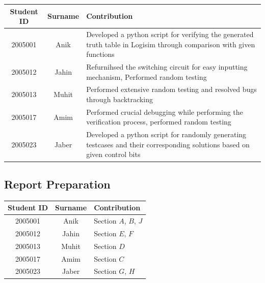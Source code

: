 \documentclass{article}
\begin{document}
\begin{table}[h]
    \centering
\begin{tabular}{|c|c|p{10cm}|}
\hline
Student ID & Surname & Contribution \\ \hline
2005001    & Anik    & Developed a python script for verifying the generated truth table in Logisim through comparison with given functions           \\ \hline
2005012    & Jahin   & Refurnihsed the switching circuit for easy inputting mechanism, Performed random testing    \\ \hline
2005013    & Muhit   &  Performed extensive random testing and resolved bugs through backtracking   \\ \hline
2005017    & Amim    &  Performed crucial debugging while performing the verification process, performed random testing   \\ \hline
2005023    & Jaber   &  Developed a python script for randomly generating testcases and their corresponding solutions based on given control bits    \\ \hline
\end{tabular}
\end{table}



\subsection{Report Preparation}



\begin{table}[h]
    \centering
\begin{tabular}{|c|c|p{10cm}|}
\hline
Student ID & Surname & Contribution \\ \hline
2005001    & Anik    & Section $A$, $B$, $J$           \\ \hline
2005012    & Jahin   & Section $E$, $F$    \\ \hline
2005013    & Muhit   & Section $D$   \\ \hline
2005017    & Amim    & Section $C$  \\ \hline
2005023    & Jaber   & Section $G$, $H$    \\ \hline
\end{tabular}
\end{table} 
\end{document}

